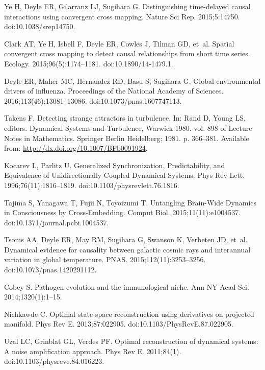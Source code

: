 \documentclass[10pt,letterpaper]{article}
\begin{document}
\begin{thebibliography}{10}
Ye H, Deyle ER, Gilarranz LJ, Sugihara G.
\newblock Distinguishing time-delayed causal interactions using convergent
  cross mapping.
\newblock Nature Sci Rep. 2015;5:14750.
\newblock doi:{10.1038/srep14750}.

Clark AT, Ye H, Isbell F, Deyle ER, Cowles J, Tilman GD, et~al.
\newblock Spatial convergent cross mapping to detect causal relationships from
  short time series.
\newblock Ecology. 2015;96(5):1174--1181.
\newblock doi:{10.1890/14-1479.1}.

Deyle ER, Maher MC, Hernandez RD, Basu S, Sugihara G.
\newblock Global environmental drivers of influenza.
\newblock Proceedings of the National Academy of Sciences.
  2016;113(46):13081--13086.
\newblock doi:{10.1073/pnas.1607747113}.

Takens F.
\newblock Detecting strange attractors in turbulence.
\newblock In: Rand D, Young LS, editors. Dynamical Systems and Turbulence,
  Warwick 1980. vol. 898 of Lecture Notes in Mathematics. Springer Berlin
  Heidelberg; 1981. p. 366--381.
\newblock Available from: \url{http://dx.doi.org/10.1007/BFb0091924}.

Kocarev L, Parlitz U.
\newblock Generalized Synchronization, Predictability, and Equivalence of
  Unidirectionally Coupled Dynamical Systems.
\newblock Phys Rev Lett. 1996;76(11):1816--1819.
\newblock doi:{10.1103/physrevlett.76.1816}.

Tajima S, Yanagawa T, Fujii N, Toyoizumi T.
\newblock Untangling Brain-Wide Dynamics in Consciousness by Cross-Embedding.
 Comput Biol. 2015;11(11):e1004537.
\newblock doi:{10.1371/journal.pcbi.1004537}.

Tsonis AA, Deyle ER, May RM, Sugihara G, Swanson K, Verbeten JD, et~al.
\newblock Dynamical evidence for causality between galactic cosmic rays and
  interannual variation in global temperature.
\newblock PNAS. 2015;112(11):3253--3256.
\newblock doi:{10.1073/pnas.1420291112}.

Cobey S.
\newblock Pathogen evolution and the immunological niche.
\newblock Ann NY Acad Sci. 2014;1320(1):1--15.

Nichkawde C.
\newblock Optimal state-space reconstruction using derivatives on projected
  manifold.
\newblock Phys Rev E. 2013;87:022905.
\newblock doi:{10.1103/PhysRevE.87.022905}.

Uzal LC, Grinblat GL, Verdes PF.
\newblock Optimal reconstruction of dynamical systems: A noise amplification
  approach.
\newblock Phys Rev E. 2011;84(1).
\newblock doi:{10.1103/physreve.84.016223}.


\end{thebibliography}
\end{document}
